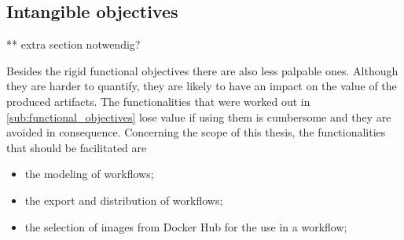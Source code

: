 
\subsection{Intangible objectives} %
  \label{sub:intangible_objectives}
  ** extra section notwendig?

  Besides the rigid functional objectives there are also less palpable ones. Although they are harder to quantify, they are likely to have an impact on the value of the produced artifacts. The functionalities that were worked out in \ref{sub:functional_objectives} lose value if using them is cumbersome and they are avoided in consequence. Concerning the scope of this thesis, the functionalities that should be facilitated are
  \begin{itemize}[nosep]
    \item the modeling of workflows;
    \item the export and distribution of workflows;
    \item the selection of images from Docker Hub for the use in a workflow;
  \end{itemize}
